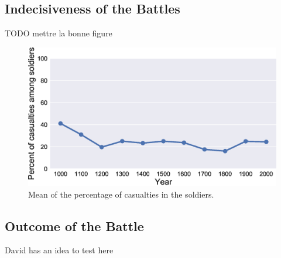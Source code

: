 \subsection{Indecisiveness of the Battles}
TODO mettre la bonne figure
 \begin{figure}[h]
	\centering	\includegraphics[width=\linewidth]{figures/casuPerCent}
	\caption{Mean of the percentage of casualties in the soldiers.}\label{fig:casuPerCent}
	\centering
\end{figure}


\subsection{Outcome of the Battle}
David has an idea to test here

